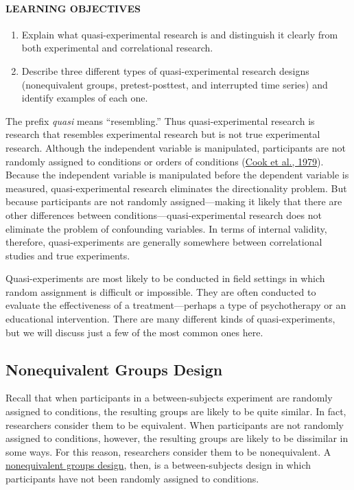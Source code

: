 \documentclass[
]{krantz}
\providecommand{\tightlist}{%
  \setlength{\itemsep}{0pt}\setlength{\parskip}{0pt}}
\begin{document}
\hypertarget{learning-objectives-26}{%
\paragraph*{LEARNING OBJECTIVES}\label{learning-objectives-26}}

\begin{enumerate}
\def\labelenumi{\arabic{enumi}.}
\tightlist
\item
  Explain what quasi-experimental research is and distinguish it clearly from both experimental and correlational research.
\item
  Describe three different types of quasi-experimental research designs (nonequivalent groups, pretest-posttest, and interrupted time series) and identify examples of each one.
\end{enumerate}

The prefix \emph{quasi} means ``resembling.'' Thus quasi-experimental research is research that resembles experimental research but is not true experimental research. Although the independent variable is manipulated, participants are not randomly assigned to conditions or orders of conditions (\protect\hyperlink{ref-cook1979quasi}{Cook et al., 1979}). Because the independent variable is manipulated before the dependent variable is measured, quasi-experimental research eliminates the directionality problem. But because participants are not randomly assigned---making it likely that there are other differences between conditions---quasi-experimental research does not eliminate the problem of confounding variables. In terms of internal validity, therefore, quasi-experiments are generally somewhere between correlational studies and true experiments.

Quasi-experiments are most likely to be conducted in field settings in which random assignment is difficult or impossible. They are often conducted to evaluate the effectiveness of a treatment---perhaps a type of psychotherapy or an educational intervention. There are many different kinds of quasi-experiments, but we will discuss just a few of the most common ones here.

\hypertarget{nonequivalent-groups-design}{%
\subsection*{Nonequivalent Groups Design}\label{nonequivalent-groups-design}}


Recall that when participants in a between-subjects experiment are randomly assigned to conditions, the resulting groups are likely to be quite similar. In fact, researchers consider them to be equivalent. When participants are not randomly assigned to conditions, however, the resulting groups are likely to be dissimilar in some ways. For this reason, researchers consider them to be nonequivalent. A \protect\hyperlink{nonequivalent-groups-design-1}{nonequivalent groups design}, then, is a between-subjects design in which participants have not been randomly assigned to conditions.
\end{document}
